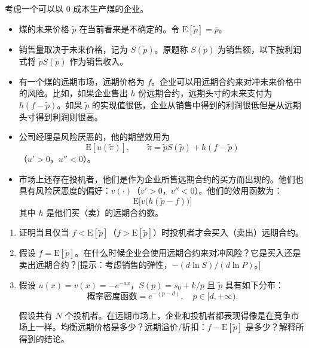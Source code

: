 \par\noindent\begin{minipage}{\linewidth}
\begin{problem}
 考虑一个可以以 0 成本生产煤的企业。
\begin{itemize}
    \item 煤的未来价格 $\tilde{p}$ 在当前看来是不确定的。令 $\mathrm{E}[\tilde{p}]=\bar{p}$。
    \item 销售量取决于未来价格，记为 $S(\tilde{p})$。原题称 $S(\tilde{p})$ 为销售额，以下按利润式将 $\tilde{p}S(\tilde{p})$ 作为销售收入。
    \item 有一个煤的远期市场，远期价格为 $f$。企业可以用远期合约来对冲未来价格中的风险。比如，如果企业售出 $h$ 份远期合约，远期头寸的未来支付为 $h(f-\tilde{p})$。如果 $\tilde{p}$ 的实现值很低，企业从销售中得到的利润很低但是从远期头寸得到利润则很高。
    \item 公司经理是风险厌恶的，他的期望效用为
    \[
        \mathrm{E}[u(\tilde{\pi})],\qquad \tilde{\pi}=\tilde{p}S(\tilde{p})+h(f-\tilde{p})
    \]
    （$u'>0$，$u''<0$）。
    \item 市场上还存在投机者，他们是作为企业所售远期合约的买方而出现的。他们也具有风险厌恶度的偏好：$v(\cdot)$（$v'>0$，$v''<0$）。他们的效用函数为：
    \[
        \mathrm{E}\bigl[v\bigl(h(\tilde{p}-f)\bigr)\bigr]
    \]
    其中 $h$ 是他们买（卖）的远期合约数。
\end{itemize}
\begin{enumerate}[label=(\alph*)]
    \item 证明当且仅当 $f<\mathrm{E}[\tilde{p}]$（$f>\mathrm{E}[\tilde{p}]$）时投机者才会买入（卖出）远期合约。
    \item 假设 $f=\mathrm{E}[\tilde{p}]$。在什么时候企业会使用远期合约来对冲风险？它是买入还是卖出远期合约？[提示：考虑销售的弹性，$-(d\ln S)/(d\ln P)$。]
    \item 假设 $u(x)=v(x)=-e^{-ax}$，$S(p)=s_{0}+k/p$ 且 $\tilde{p}$ 具有如下分布：
    \[
        \text{概率密度函数}=e^{-(p-d)},\quad p\in[d,+\infty).
    \]

    假设共有 $N$ 个投机者。在远期市场上，企业和投机者都表现得像是在竞争市场上一样。均衡远期价格是多少？远期溢价/折扣：$f-\mathrm{E}[\tilde{p}]$ 是多少？解释所得到的结论。
\end{enumerate}
\end{problem}
\end{minipage}\par
{}
